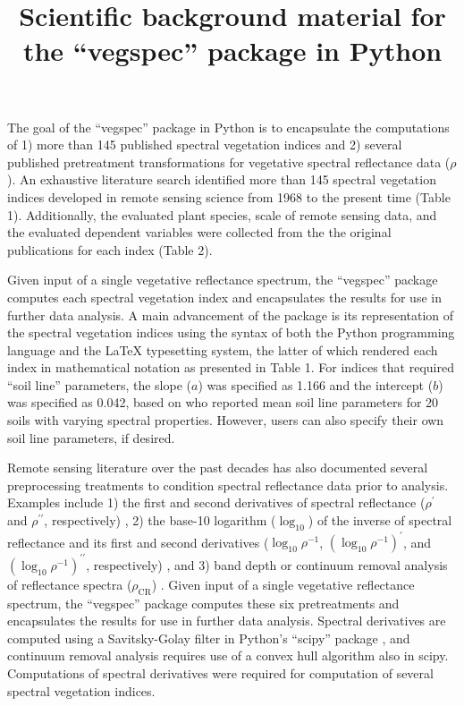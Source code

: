 \documentclass[10pt]{article}
\begin{document}
\title{Scientific background material for the ``vegspec'' package in Python}

\maketitle

The goal of the ``vegspec'' package in Python is to encapsulate the computations of 1) more than 145 published spectral vegetation indices and 2) several published pretreatment transformations for vegetative spectral reflectance data ($\rho$). An exhaustive literature search identified more than 145 spectral vegetation indices developed in remote sensing science from 1968 to the present time (Table 1). Additionally, the evaluated plant species, scale of remote sensing data, and the evaluated dependent variables were collected from the the original publications for each index (Table 2).

Given input of a single vegetative reflectance spectrum, the ``vegspec'' package computes each spectral vegetation index and encapsulates the results for use in further data analysis. A main advancement of the package is its representation of the spectral vegetation indices using the syntax of both the Python programming language and the LaTeX typesetting system, the latter of which rendered each index in mathematical notation as presented in Table 1. For indices that required ``soil line'' parameters, the slope ($a$) was specified as 1.166 and the intercept ($b$) was specified as 0.042, based on \citet{Huete1984} who reported mean soil line parameters for 20 soils with varying spectral properties. However, users can also specify their own soil line parameters, if desired.

Remote sensing literature over the past decades has also documented several preprocessing treatments to condition spectral reflectance data prior to analysis. Examples include 1) the first and second derivatives of spectral reflectance ($\rho^\prime$ and $\rho^{\prime\prime}$, respectively) \citep{Horler1983}, 2) the base-10 logarithm ($\log_{10}$) of the inverse of spectral reflectance and its first and second derivatives ($\log_{10} \rho^{-1}$, $(\log_{10} \rho^{-1})^\prime$, and $(\log_{10} \rho^{-1})^{\prime\prime}$, respectively) \citep{Blackburn1998a,Yoder1995}, and 3) band depth or continuum removal analysis of reflectance spectra ($\rho_{\text{CR}}$) \citep{Curran2001,Huang2004,Kokaly1999}. Given input of a single vegetative reflectance spectrum, the ``vegspec'' package computes these six pretreatments and encapsulates the results for use in further data analysis. Spectral derivatives are computed using a Savitsky-Golay filter in Python’s ``scipy'' package \citep{Virtanen2020}, and continuum removal analysis requires use of a convex hull algorithm also in scipy. Computations of spectral derivatives were required for computation of several spectral vegetation indices.
\end{document}
